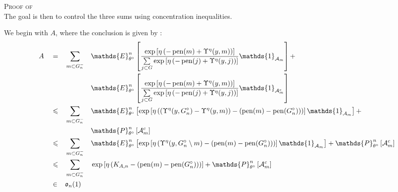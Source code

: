 \begin{pro}{\textsc{Proof of } \\}
The goal is then to control the three sums using concentration inequalities.

We begin with $A$, where the conclusion is given by :
\begin{alignat*}{4}
& A && = && \sum\limits_{m \subset G^{-}_{n}} && \mathds{E}_{\theta^{\circ}}^{n}\left[\frac{\exp\left[\eta\left(-\pen(m) + \Upsilon^{\eta}(y, m)\right)\right]}{\sum\limits_{j \subset G}\exp\left[\eta \left(- \pen(j) + \Upsilon^{\eta}(y, j)\right)\right]} \mathds{1}_{\mathcal{A}_{m}}\right] + \\
& && && && \mathds{E}_{\theta^{\circ}}^{n}\left[\frac{\exp\left[\eta\left(-\pen(m) + \Upsilon^{\eta}(y, m)\right)\right]}{\sum\limits_{j \subset G}\exp\left[\eta \left(- \pen(j) + \Upsilon^{\eta}(y, j)\right)\right]} \mathds{1}_{\mathcal{A}_{m}^{c}}\right]\\
& && \leq && \sum\limits_{m \subset G^{-}_{n}} && \mathds{E}_{\theta^{\circ}}^{n}\left[\exp\left[\eta\left(\left(\Upsilon^{\eta}(y, G^{\circ}_{n}) - \Upsilon^{\eta}(y, m)\right) - (\pen(m) - \pen(G^{\circ}_{n}))\right)\right] \mathds{1}_{\mathcal{A}_{m}}\right] + \\
& && && && \mathds{P}_{\theta^{\circ}}^{n}\left[ \mathcal{A}_{m}^{c}\right]\\
& && \leq && \sum\limits_{m \subset G^{-}_{n}} && \mathds{E}_{\theta^{\circ}}^{n}\left[\exp\left[\eta\left(\Upsilon^{\eta}(y, G^{\circ}_{n} \setminus m) - (\pen(m) - \pen(G^{\circ}_{n}))\right)\right] \mathds{1}_{\mathcal{A}_{m}}\right] + \mathds{P}_{\theta^{\circ}}^{n}\left[ \mathcal{A}_{m}^{c}\right]\\
& && \leq && \sum\limits_{m \subset G^{-}_{n}} && \exp\left[\eta\left(K_{A, n} - (\pen(m) - \pen(G^{\circ}_{n}))\right)\right] + \mathds{P}_{\theta^{\circ}}^{n}\left[ \mathcal{A}_{m}^{c}\right]\\
& && \in && \mathfrak{o}_{n}(1)
\end{alignat*}

\medskip


\end{pro}
